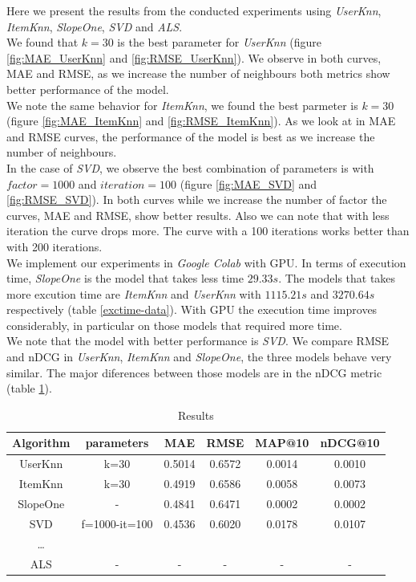\documentclass[letterpaper, 10 pt, conference]{ieeeconf}  %
\begin{document}
Here we present the results from the conducted experiments using \textit{UserKnn}, \textit{ItemKnn}, \textit{SlopeOne}, \textit{SVD} and \textit{ALS}.\\
We found that $k=30$ is the best parameter for \textit{UserKnn} (figure \ref{fig:MAE_UserKnn} and  \ref{fig:RMSE_UserKnn}). We observe in both curves, MAE and RMSE, as we increase the number of neighbours both metrics show better performance of the model.\\
We note the same behavior for \textit{ItemKnn}, we found the best parmeter is $k=30$ (figure \ref{fig:MAE_ItemKnn} and \ref{fig:RMSE_ItemKnn}). As we look at in MAE and RMSE curves, the performance of the model is best as we increase the number of neighbours.\\
In the case of \textit{SVD}, we observe the best combination of parameters is with $factor=1000$ and $iteration=100$ (figure \ref{fig:MAE_SVD} and \ref{fig:RMSE_SVD}). In both curves while we increase the number of factor the curves, MAE and RMSE, show better results. Also we can note that with less iteration the curve drops more. The curve with a 100 iterations works better than with 200 iterations.\\
We implement our experiments in \textit{Google Colab} with GPU. In terms of execution time, \textit{SlopeOne} is the model that takes less time $29.33 s$. The models that takes more excution time are \textit{ItemKnn} and \textit{UserKnn} with $1115.21 s$ and $3270.64 s$ respectively (table \ref{exctime-data}). With GPU the execution time improves considerably, in particular on those models that required more time.\\
We note that the model with better performance is \textit{SVD}. We compare RMSE and nDCG in \textit{UserKnn}, \textit{ItemKnn} and \textit{SlopeOne}, the three models behave very similar. The major diferences between those models are in the nDCG metric (table \ref{raw-data}).\\

\begin{table}[]
\centering
\begin{tabular}{|c|c|c|c|c|c|}
\hline 
\rowcolor[HTML]{DAE8FC} 
Algorithm & parameters & MAE & RMSE & MAP@10 & nDCG@10   \\ \hline \hline
UserKnn   & k=30  &  0.5014 &  0.6572   & 0.0014 & 0.0010 \\ \hline
ItemKnn   & k=30  &  0.4919 &  0.6586 &  0.0058 & 0.0073  \\ \hline
SlopeOne   & -  &   0.4841 &  0.6471   &   0.0002   &  0.0002 \\ \hline

SVD   & f=1000-it=100  & 0.4536 &  0.6020   &   0.0178   & 0.0107  \\ \hline
\dots       &        &         &        &          &            \\ \hline
ALS   & -   & -     & -    &    -   & - \\ \hline

\end{tabular}
\caption{Results}
\label{raw-data}
\end{table}
\end{document}
